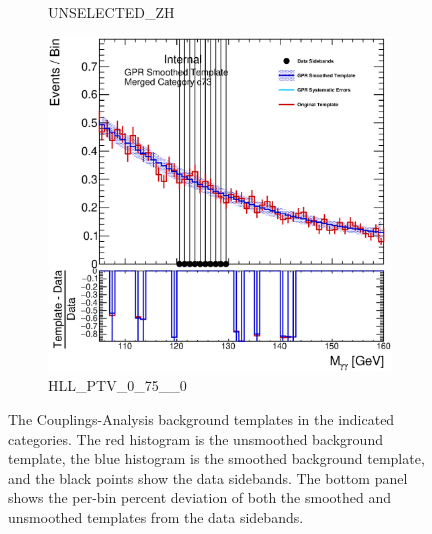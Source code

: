 \begin{figure}
\begin{center}
\begin{subfigure}[T]{0.49\linewidth}
	\caption{UNSELECTED\_ZH}
\end{subfigure}
\begin{subfigure}[T]{0.49\linewidth}
	\centering
	\includegraphics[width=\linewidth]{figures/background/gpr/coupCatTemplates/GPR_Smoothed_Plot_hmgg_c73.eps}
	\caption{HLL\_PTV\_0\_75\_\_0}
\end{subfigure}
\caption{The Couplings-Analysis background templates in the indicated categories. The red histogram is the unsmoothed background template, the blue histogram is the smoothed background template, and the black points show the data sidebands. The bottom panel shows the per-bin percent deviation of both the smoothed and unsmoothed templates from the data sidebands. }
 \label{fig:gpr_coupcat_18}
 \end{center}
\end{figure}

